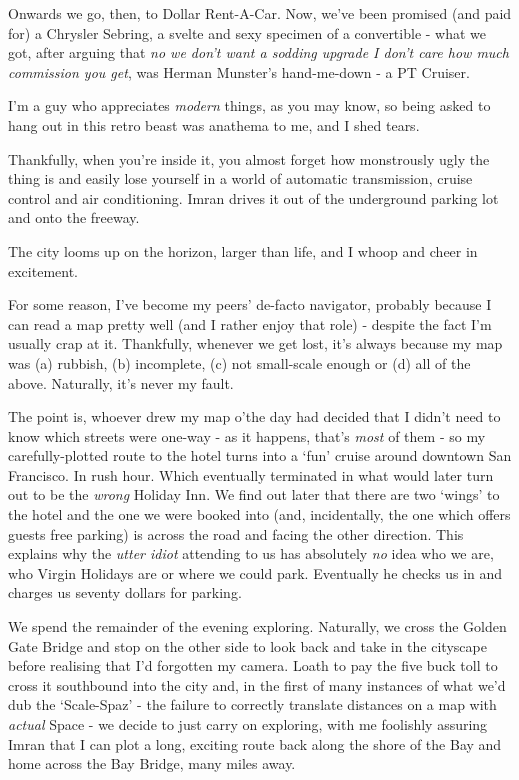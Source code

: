 \documentclass[a5paper,titlepage,11pt]{book}
\begin{document}
Onwards we go, then, to Dollar Rent-A-Car.  Now, we've been promised (and paid for) a Chrysler Sebring, a svelte and sexy specimen of a convertible - what we got, after arguing that \emph{no we don't want a sodding upgrade I don't care how much commission you get}, was Herman Munster's hand-me-down - a PT Cruiser.

I'm a guy who appreciates \emph{modern} things, as you may know, so being asked to hang out in this retro beast was anathema to me, and I shed tears.

Thankfully, when you're inside it, you almost forget how monstrously ugly the thing is and easily lose yourself in a world of automatic transmission, cruise control and air conditioning.  Imran drives it out of the underground parking lot and onto the freeway.

The city looms up on the horizon, larger than life, and I whoop and cheer in excitement.

For some reason, I've become my peers' de-facto navigator, probably because I can read a map pretty well (and I rather enjoy that role) - despite the fact I'm usually crap at it.  Thankfully, whenever we get lost, it's always because my map was (a) rubbish, (b) incomplete, (c) not small-scale enough or (d) all of the above.  Naturally, it's never my fault.

The point is, whoever drew my map o'the day had decided that I didn't need to know which streets were one-way - as it happens, that's \emph{most} of them - so my carefully-plotted route to the hotel turns into a `fun' cruise around downtown San Francisco.  In rush hour.  Which eventually terminated in what would later turn out to be the \emph{wrong} Holiday Inn.  We find out later that there are two `wings' to the hotel and the one we were booked into (and, incidentally, the one which offers guests free parking) is across the road and facing the other direction.  This explains why the \emph{utter idiot} attending to us has absolutely \emph{no} idea who we are, who Virgin Holidays are or where we could park.  Eventually he checks us in and charges us seventy dollars for parking.  

We spend the remainder of the evening exploring.  Naturally, we cross the Golden Gate Bridge and stop on the other side to look back and take in the cityscape before realising that I'd forgotten my camera.  Loath to pay the five buck toll to cross it southbound into the city and, in the first of many instances of what we'd dub the `Scale-Spaz' - the failure to correctly translate distances on a map with \emph{actual} Space - we decide to just carry on exploring, with me foolishly assuring Imran that I can plot a long, exciting route back along the shore of the Bay and home across the Bay Bridge, many miles away.
\end{document}
